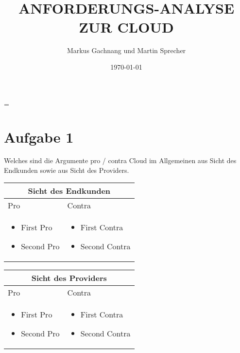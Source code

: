 \documentclass[11pt,titlepage]{article}
\title{ANFORDERUNGS-ANALYSE ZUR CLOUD}
\author{Markus Gachnang und Martin Sprecher}
\date{\today{}}
\newenvironment{shadedquotation}
 {\begin{shaded*}
  \quoting[leftmargin=0pt, vskip=0pt]
 }
 {\endquoting
 \end{shaded*}
}
\begin{document}
\sffamily
\maketitle
\newpage
\tableofcontents{}
\setcounter{page}{1}
\newpage
\RaggedRight
\emergencystretch=\maxdimen
{}

\section{Aufgabe 1}
\label{sec:Aufgabe-1}

\begin{shadedquotation}
  Welches sind die Argumente pro / contra Cloud im Allgemeinen aus Sicht des Endkunden sowie aus Sicht des Providers.
\end{shadedquotation}

\par\medskip

\begin{tabular}{ |p{7cm}|p{7cm}|  }
  \hline
  \multicolumn{2}{|c|}{Sicht des Endkunden} \\
  \hline
  Pro & Contra \\
  \hline
  \begin{itemize}
    \item First Pro
    \item Second Pro
  \end{itemize}
  & 
  \begin{itemize}
    \item First Contra
    \item Second Contra
  \end{itemize}
  \\
  \hline
\end{tabular}

\par\medskip

\begin{tabular}{ |p{7cm}|p{7cm}|  }
  \hline
  \multicolumn{2}{|c|}{Sicht des Providers} \\
  \hline
  Pro & Contra \\
  \hline
  \begin{itemize}
    \item First Pro
    \item Second Pro
  \end{itemize}
  & 
  \begin{itemize}
    \item First Contra
    \item Second Contra
  \end{itemize}
  \\
  \hline
\end{tabular}
\end{document}
